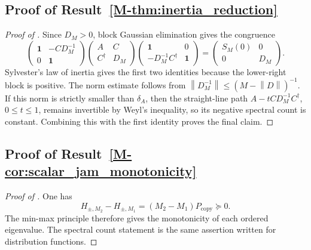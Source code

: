 \documentclass[11pt]{article}
\numberwithin{equation}{section}
\theoremstyle{definition}
\theoremstyle{remark}
\newcommand{\Id}{\mathbf{1}}
\newcommand{\opnorm}[1]{\left\lVert#1\right\rVert}
\begin{document}
\subsection{Proof of Result~\ref{M-thm:inertia_reduction}}\label{app:proof:thm:inertia_reduction}
\begin{proof}[Proof of ]
Since \(D_M>0\), block Gaussian elimination gives the congruence
\[
\begin{pmatrix}
\Id&-CD_M^{-1}\\
0&\Id
\end{pmatrix}
\begin{pmatrix}
A&C\\ C^\dagger&D_M
\end{pmatrix}
\begin{pmatrix}
\Id&0\\
-D_M^{-1}C^\dagger&\Id
\end{pmatrix}
=
\begin{pmatrix}
S_M(0)&0\\
0&D_M
\end{pmatrix}.
\]
Sylvester's law of inertia gives the first two identities because the lower-right block is
positive. The norm estimate follows from
\(\opnorm{D_M^{-1}}\le(M-\opnorm D)^{-1}\). If this norm is strictly smaller than
\(\delta_A\), then the straight-line path \(A-tCD_M^{-1}C^\dagger\), \(0\le t\le1\), remains
invertible by Weyl's inequality, so its negative spectral count is constant. Combining this with
the first identity proves the final claim.
\end{proof}

\subsection{Proof of Result~\ref{M-cor:scalar_jam_monotonicity}}\label{app:proof:cor:scalar_jam_monotonicity}
\begin{proof}[Proof of ]
One has
\[
H_{\pm,M_2}-H_{\pm,M_1}=(M_2-M_1)P_{\mathrm{copy}}\succeq0.
\]
The min-max principle therefore gives the monotonicity of each ordered eigenvalue. The spectral
count statement is the same assertion written for distribution functions.
\end{proof}
\end{document}
